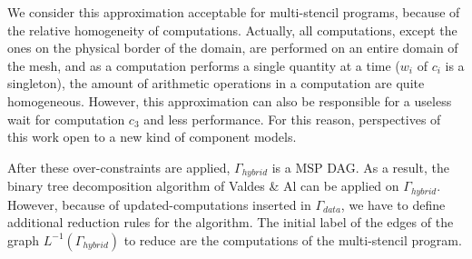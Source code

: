 We consider this approximation acceptable for multi-stencil programs, because of the relative homogeneity of computations. Actually, all computations, except the ones on the physical border of the domain, are performed on an entire domain of the mesh, and as a computation performs a single quantity at a time ($w_i$ of $c_i$ is a singleton), the amount of arithmetic operations in a computation are quite homogeneous. However, this approximation can also be responsible for a useless wait for computation $c_3$ and less performance. For this reason, perspectives of this work open to a new kind of component models.

After these over-constraints are applied, $\Gamma_{hybrid}$ is a MSP DAG. As a result, the binary tree decomposition algorithm of Valdes \& Al can be applied on $\Gamma_{hybrid}$. However, because of updated-computations inserted in $\Gamma_{data}$, we have to define additional reduction rules for the algorithm. %
The initial label of the edges of the graph $L^{-1}(\Gamma_{hybrid})$ to reduce are the computations of the multi-stencil program. %

 
 
